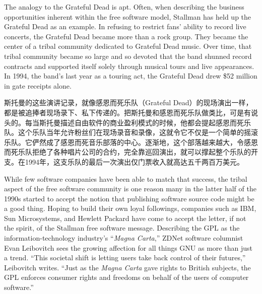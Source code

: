 \ifdefined\eng
The analogy to the Grateful Dead is apt. Often, when describing the business opportunities inherent within the free software model, Stallman has held up the Grateful Dead as an example. In refusing to restrict fans' ability to record live concerts, the Grateful Dead became more than a rock group. They became the center of a tribal community dedicated to Grateful Dead music. Over time, that tribal community became so large and so devoted that the band shunned record contracts and supported itself solely through musical tours and live appearances. In 1994, the band's last year as a touring act, the Grateful Dead drew \$52 million in gate receipts alone.
\fi

\ifdefined\chs
斯托曼的这些演讲记录，就像感恩而死乐队（Grateful Dead）的现场演出一样，都是被追捧者现场录下、私下传递的。把斯托曼和感恩而死乐队做类比，可是有说头的。每当斯托曼描述自由软件的商业盈利模式的时候，他都会提起感恩而死乐队。这个乐队当年允许粉丝们在现场录音和录像，这就令它不仅是一个简单的摇滚乐队。它俨然成了感恩而死音乐部落的中心。逐渐地，这个部落越来越大，令感恩而死乐队拒绝了各种唱片公司的合约，完全靠巡回演出，就可以撑起整个乐队的开支。在1994年，这支乐队的最后一次演出仅门票收入就高达五千两百万美元。
\fi

\ifdefined\eng
While few software companies have been able to match that success, the tribal aspect of the free software community is one reason many in the latter half of the 1990s started to accept the notion that publishing software source code might be a good thing. Hoping to build their own loyal followings, companies such as IBM, Sun Microsystems, and Hewlett Packard have come to accept the letter, if not the spirit, of the Stallman free software message. Describing the GPL as the information-technology industry's ``\textit{Magna Carta},'' ZDNet software columnist Evan Leibovitch sees the growing affection for all things GNU as more than just a trend. ``This societal shift is letting users take back control of their futures,'' Leibovitch writes. ``Just as the \textit{Magna Carta} gave rights to British subjects, the GPL enforces consumer rights and freedoms on behalf of the users of computer software.''
\fi

